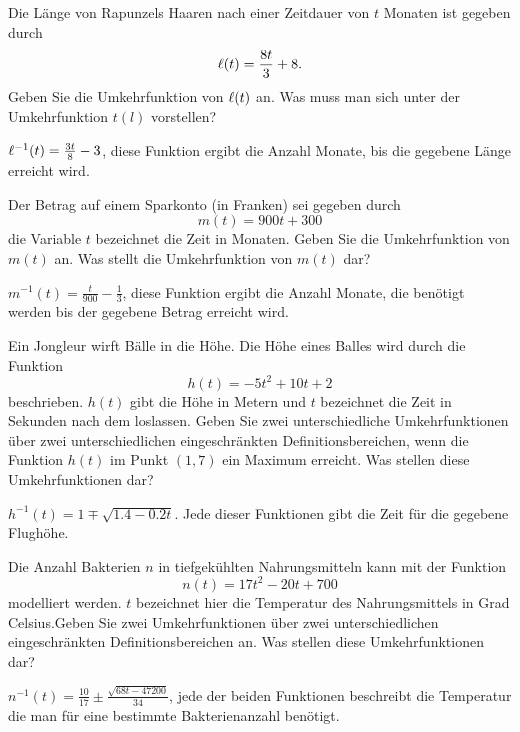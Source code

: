 \begin{exercises}

\begin{exercise}
Die Länge von Rapunzels Haaren nach einer Zeitdauer von $t$ Monaten ist gegeben durch
\[
\ell(t) = \frac{8t}{3}+8.
\]
Geben Sie die Umkehrfunktion von $\ell(t)$ an.  Was muss man sich unter der Umkehrfunktion $t(l)$
 vorstellen?
\begin{answer}
$\ell^{-1}(t) = \frac{3t}{8} - 3$, diese Funktion ergibt die Anzahl Monate, bis die gegebene Länge erreicht wird.
\end{answer}
\end{exercise}

\begin{exercise}
Der Betrag auf einem Sparkonto (in Franken) sei gegeben durch
\[
m(t) = 900t + 300
\]
die Variable $t$ bezeichnet die Zeit in Monaten. Geben Sie die Umkehrfunktion von $m(t)$ an.  Was stellt die Umkehrfunktion von $m(t)$ dar?
\begin{answer}
$m^{-1}(t) = \frac{t}{900} - \frac{1}{3}$, diese Funktion ergibt die Anzahl Monate, die benötigt werden bis der gegebene Betrag erreicht wird.
\end{answer}
\end{exercise}

\begin{exercise}
Ein Jongleur wirft Bälle in die Höhe. Die Höhe eines Balles wird durch die Funktion
\[
h(t) = -5t^2+10t+2
\]
beschrieben. $h(t)$ gibt die Höhe in Metern und $t$ bezeichnet die Zeit in Sekunden nach dem loslassen. Geben Sie zwei unterschiedliche Umkehrfunktionen über zwei unterschiedlichen eingeschränkten Definitionsbereichen, wenn die Funktion $h(t)$ im Punkt $(1,7)$ ein Maximum erreicht. Was stellen diese Umkehrfunktionen dar?
\begin{answer}
$h^{-1}(t) = 1 \mp \sqrt{1.4-0.2t}$.  Jede dieser Funktionen gibt die Zeit für die gegebene Flughöhe.
\end{answer}
\end{exercise}

\begin{exercise}
Die Anzahl Bakterien $n$ in tiefgekühlten Nahrungsmitteln kann mit der Funktion
\[
n(t) =17t^2 - 20t + 700
\]
modelliert werden. $t$ bezeichnet hier die Temperatur des Nahrungsmittels in Grad Celsius.Geben Sie zwei Umkehrfunktionen über zwei unterschiedlichen eingeschränkten Definitionsbereichen an. Was stellen diese Umkehrfunktionen dar?
\begin{answer}
$n^{-1}(t)= \frac{10}{17} \pm \frac{\sqrt{68t-47200}}{34}$, jede der beiden Funktionen beschreibt die Temperatur die man für eine bestimmte Bakterienanzahl benötigt.
\end{answer}
\end{exercise}



\end{exercises}
